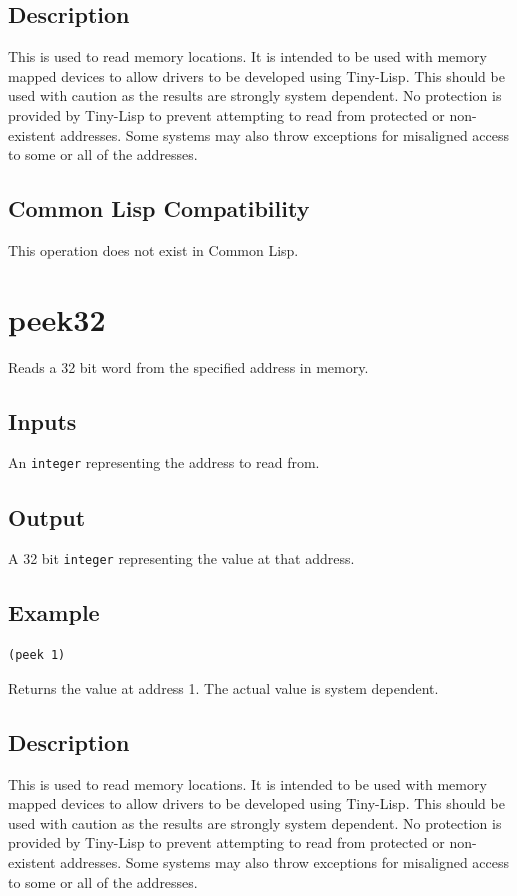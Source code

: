 \documentclass[10pt, openany]{book}
\newcommand{\datatype}[1]{\texttt{#1}}
\newcommand{\tl}{Tiny-Lisp}
\newcommand{\cl}{Common Lisp}
\begin{document}
\subsection{Description}
This is used to read memory locations.  It is intended to be used with memory mapped devices to allow drivers to be developed using \tl{}.  This should be used with caution as the results are strongly system dependent.  No protection is provided by \tl{} to prevent attempting to read from protected or non-existent addresses.  Some systems may also throw exceptions for misaligned access to some or all of the addresses.
\subsection{Common Lisp Compatibility}
This operation does not exist in \cl.

\section{peek32}
Reads a 32 bit word from the specified address in memory.
\subsection{Inputs}
An \datatype{integer} representing the address to read from.
\subsection{Output}
A 32 bit \datatype{integer} representing the value at that address.
\subsection{Example}
\begin{lstlisting}
(peek 1)
\end{lstlisting}
Returns the value at address 1.  The actual value is system dependent.
\subsection{Description}
This is used to read memory locations.  It is intended to be used with memory mapped devices to allow drivers to be developed using \tl{}.  This should be used with caution as the results are strongly system dependent.  No protection is provided by \tl{} to prevent attempting to read from protected or non-existent addresses.  Some systems may also throw exceptions for misaligned access to some or all of the addresses.
\end{document}
